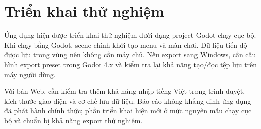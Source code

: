 \documentclass[../DoAn.tex]{subfiles}
\begin{document}
\section{Triển khai thử nghiệm}
\label{section:4.8}

Ứng dụng hiện được triển khai thử nghiệm dưới dạng project Godot chạy cục bộ. Khi chạy bằng Godot, scene chính  khởi tạo menu và màn chơi. Dữ liệu tiến độ được lưu trong vùng  nên không cần máy chủ. Nếu export sang Windows, cần cấu hình export preset trong Godot 4.x và kiểm tra lại khả năng tạo/đọc tệp lưu trên máy người dùng.

Với bản Web, cần kiểm tra thêm khả năng nhập tiếng Việt trong trình duyệt, kích thước giao diện và cơ chế lưu dữ liệu. Báo cáo không khẳng định ứng dụng đã phát hành chính thức; phần triển khai hiện mới ở mức nguyên mẫu chạy cục bộ và chuẩn bị khả năng export thử nghiệm.
\end{document}
